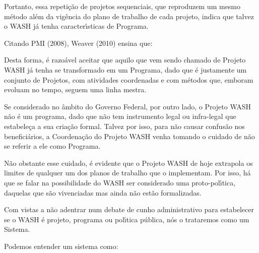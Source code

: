\documentclass[
12pt,		%
openright,	%
twoside,  %
a4paper,			%
chapter=TITLE,		%
english,			%
french,				%
spanish,			%
brazil				%
]{USPSC-classe/USPSC}
\begin{document}
Portanto, essa repeti\c{c}\~ao de projetos sequenciais, que reproduzem um mesmo m\'etodo al\'em da vig\^encia do plano de trabalho de cada projeto, indica que talvez o WASH j\'a tenha caracter\'{\i}sticas de Programa.


Citando  PMI (2008), Weaver (2010) ensina que:



\noindent\begin{center}\mbox{\centering{}}\end{center}


Desta forma, \'e razo\'avel aceitar que aquilo que vem sendo chamado de Projeto WASH j\'a tenha se transformado em um Programa, dado que \'e justamente um conjunto de Projetos, com atividades coordenadas e com m\'etodos que, emboram evoluam no tempo, seguem uma linha mestra.


Se considerado no \^ambito do Governo Federal, por outro lado, o Projeto WASH n\~ao \'e um programa, dado que n\~ao tem instrumento legal ou infra-legal que estabele\c{c}a a sua cria\c{c}\~ao formal. Talvez por isso, para n\~ao causar confus\~ao nos benefici\'arios, a Coordena\c{c}\~ao do Projeto WASH venha tomando o cuidado de n\~ao se referir a ele como Programa.


N\~ao obstante esse cuidado, \'e evidente que o Projeto WASH de hoje extrapola os limites de qualquer um dos planos de trabalho que o implementam. Por isso, h\'a que se falar na possibilidade do WASH ser considerado uma proto-pol\'{\i}tica, daquelas que s\~ao vivenciadas mas ainda n\~ao est\~ao formalizadas.


Com vistas a n\~ao adentrar num debate de cunho administrativo para estabelecer se o WASH \'e projeto, programa ou pol\'{\i}tica p\'ublica, n\'os o trataremos como um Sistema.


Podemos entender um sistema como:



\noindent\begin{center}\mbox{\centering{}}\end{center}
\end{document}
